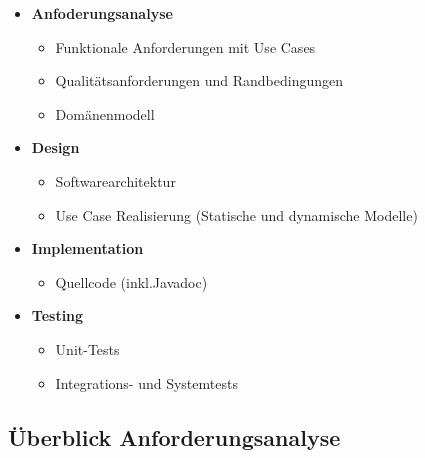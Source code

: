 \documentclass[../ZF_SWEN1.tex]{subfiles}
\begin{document}
\begin{itemize}
	\item \textbf{\colorbox {magenta!30}{Anfoderungsanalyse}}
	\begin{itemize}
		\item Funktionale Anforderungen mit Use Cases
		\item Qualitätsanforderungen und Randbedingungen
		\item Domänenmodell
	\end{itemize}
	\item \textbf{\colorbox {magenta!30}{Design}}
	\begin{itemize}
		\item Softwarearchitektur
		\item Use Case Realisierung (Statische und dynamische Modelle)
	\end{itemize}
	\item \textbf{\colorbox {magenta!30}{ Implementation}}
	\begin{itemize}
		\item Quellcode (inkl.Javadoc)
	\end{itemize}
	\item \textbf{\colorbox {magenta!30}{Testing}}
	\begin{itemize}
		\item Unit-Tests
		\item Integrations- und Systemtests
	\end{itemize}
\end{itemize}

\subsection{Überblick Anforderungsanalyse}
\end{document}
